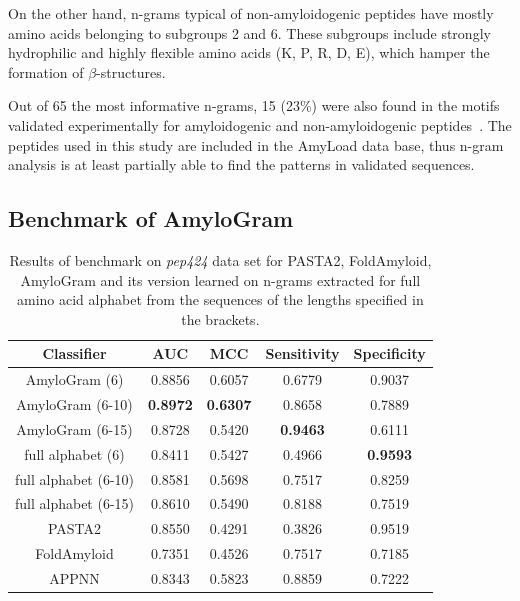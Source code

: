 \documentclass[fleqn,10pt,twoside]{gcb15submission}
\begin{document}
  On the other hand, n-grams typical of non-amyloidogenic peptides have mostly 
amino acids belonging to subgroups 2 and 6. These subgroups include strongly 
hydrophilic and highly flexible amino acids (K, P, R, D, E), which hamper the 
formation of $\beta$-structures.

  Out of 65 the most informative n-grams, 15 (23\%) were also found in the motifs 
validated experimentally for amyloidogenic and non-amyloidogenic 
peptides~\citep{lopez_de_la_paz_sequence_2004}. The peptides used in this study are 
included in the AmyLoad data base, thus n-gram analysis is at least 
partially able to find the patterns in validated sequences.

\subsection{Benchmark of AmyloGram}

\begin{table}[ht]
\centering
\small
\caption{Results of benchmark on \textit{pep424} data set for PASTA2, 
FoldAmyloid, AmyloGram and its version learned on n-grams extracted for full amino acid alphabet from the sequences of the lengths specified in 
the brackets.} 
\label{tab:bench_summary}
\begin{tabular}{ccccc}
  \toprule
Classifier & AUC & MCC & Sensitivity & Specificity \\ 
  \midrule
AmyloGram (6) & 0.8856 & 0.6057 & 0.6779 & 0.9037 \\
\rowcolor[gray]{0.85}AmyloGram (6-10) & \textbf{0.8972} & \textbf{0.6307} & 
0.8658 & 0.7889 \\ 
AmyloGram (6-15) & 0.8728 & 0.5420 & \textbf{0.9463} & 0.6111 \\ 
   \rowcolor[gray]{0.85}full alphabet (6) & 0.8411 & 0.5427 & 0.4966 & 
\textbf{0.9593} \\ 
  full alphabet (6-10) & 0.8581 & 0.5698 & 0.7517 & 0.8259 \\ 
   \rowcolor[gray]{0.85}full alphabet (6-15) & 0.8610 & 0.5490 & 0.8188 & 
0.7519 \\ 
\hline \hline
  PASTA2 & 0.8550 & 0.4291 & 0.3826 & 0.9519 \\ 
   \rowcolor[gray]{0.85}FoldAmyloid & 0.7351 & 0.4526 & 0.7517 & 0.7185 \\ 
  APPNN & 0.8343 & 0.5823 & 0.8859 & 0.7222 \\ 
   \bottomrule
\end{tabular}
\end{table}
\end{document}
